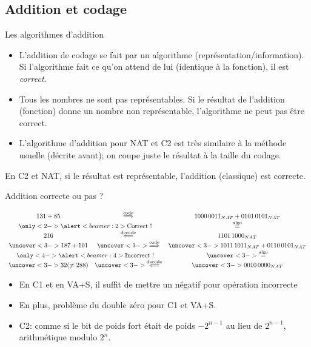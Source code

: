 \subsection{Addition et codage}
\begin{frame}{Les algorithmes d'addition}
  \begin{itemize}
  \item L'addition de codage se fait par un algorithme
    (représentation/information). Si l'algorithme fait ce qu'on attend
    de lui (identique à la fonction), il est \emph{correct}.
  \item Tous les nombres ne sont pas représentables. Si le résultat de
    l'addition (fonction) donne un nombre non représentable,
    l'algorithme ne peut pas être correct.
  \item L'algorithme d'addition pour NAT et C2 est très similaire à la
    méthode usuelle (décrite avant); on coupe juste le résultat à la
    taille du codage.
  \end{itemize}
  \begin{theorem}
    En C2 et NAT, si le résultat est représentable, l'addition
    (classique) est correcte.
  \end{theorem}
\end{frame}
\begin{frame}{Addition correcte ou pas ?}
  \begin{example}
    \[\begin{array}{ccc}
      131+85 & \stackrel{\text{code}}{\Longrightarrow} & 1000\,0011_{NAT}+0101\,0101_{NAT}\\
      \multicolumn{2}{c}{\only<2->{\alert<beamer:2>{\text{Correct !}}}} & \stackrel{\text{algo}}{=}\\
      216 & \stackrel{\text{decode}}{\Longleftarrow} & 1101\,1000_{NAT}\\
      \uncover<3->{187+101} & \uncover<3->{\stackrel{\text{code}}{\Longrightarrow}} & \uncover<3->{1011\,1011_{NAT}+0110\,0101_{NAT}}\\
      \multicolumn{2}{c}{\only<4->{\alert<beamer:4>{\text{Incorrect !}}}} & \uncover<3->{\stackrel{\text{algo}}{=}}\\
      \uncover<3->{32(\neq288)} & \uncover<3->{\stackrel{\text{decode}}{\Longleftarrow}} & \uncover<3->{0010\,0000_{NAT}}\\
    \end{array}\]
  \end{example}
  \begin{itemize}
  \item En C1 et en VA+S, il suffit de mettre un négatif pour opération
    incorrecte
  \item En plus, problème du double zéro pour C1 et VA+S.
  \item C2: comme si le bit de poids fort était de poids $-2^{n-1}$ au lieu de
    $2^{n-1}$, arithmétique modulo $2^n$.
  \end{itemize}
\end{frame}
